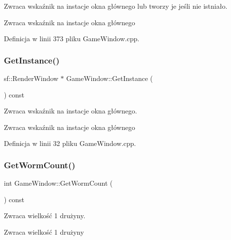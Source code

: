 Zwraca wskaźnik na instacje okna głównego lub tworzy je jeśli nie istniało. 

\begin{DoxyReturn}{Zwraca}
wskaźnik na instacje okna głównego 
\end{DoxyReturn}


Definicja w linii 373 pliku Game\+Window.\+cpp.

\mbox{\label{class_game_window_aa5ef8ededf54c333a5b19344b95220de}} 
\subsubsection{\texorpdfstring{Get\+Instance()}{GetInstance()}}
{\footnotesize\ttfamily sf\+::\+Render\+Window $\ast$ Game\+Window\+::\+Get\+Instance (\begin{DoxyParamCaption}{ }\end{DoxyParamCaption}) const}



Zwraca wskaźnik na instacje okna głównego. 

\begin{DoxyReturn}{Zwraca}
wskaźnik na instacje okna głównego 
\end{DoxyReturn}


Definicja w linii 32 pliku Game\+Window.\+cpp.

\mbox{\label{class_game_window_acfef11596afd262e0e4e77051ed24cde}} 
\subsubsection{\texorpdfstring{Get\+Worm\+Count()}{GetWormCount()}}
{\footnotesize\ttfamily int Game\+Window\+::\+Get\+Worm\+Count (\begin{DoxyParamCaption}{ }\end{DoxyParamCaption}) const}



Zwraca wielkość 1 drużyny. 

\begin{DoxyReturn}{Zwraca}
wielkość 1 drużyny 
\end{DoxyReturn}


